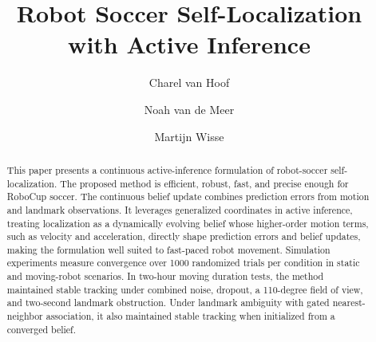 \documentclass[runningheads]{llncs}
\begin{document}
\title{Robot Soccer Self-Localization with Active Inference}


\author{
Charel van Hoof \and
Noah van de Meer \and
Martijn Wisse
}



\maketitle
\begingroup
\renewcommand{\thefootnote}{\fnsymbol{footnote}}
\endgroup

\begin{abstract}
This paper presents a continuous active-inference formulation of robot-soccer self-localization. The proposed method is efficient, robust, fast, and precise enough for RoboCup soccer. The continuous belief update combines prediction errors from motion and landmark observations. It leverages generalized coordinates in active inference, treating localization as a dynamically evolving belief whose higher-order motion terms, such as velocity and acceleration, directly shape prediction errors and belief updates, making the formulation well suited to fast-paced robot movement. Simulation experiments measure convergence over 1000 randomized trials per condition in static and moving-robot scenarios. In two-hour moving duration tests, the method maintained stable tracking under combined noise, dropout, a 110-degree field of view, and two-second landmark obstruction. Under landmark ambiguity with gated nearest-neighbor association, it also maintained stable tracking when initialized from a converged belief.
\end{abstract}












\clearpage

\end{document}
